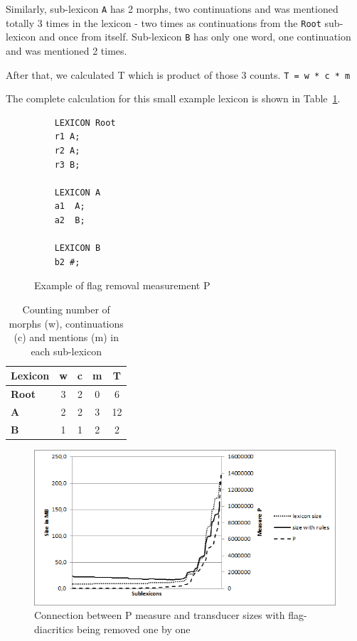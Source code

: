 \documentclass[10pt, a4paper]{article}
\begin{document}
Similarly, sub-lexicon \verb+A+ has 2 morphs, two continuations and was mentioned totally 3 times in the lexicon - 
two times as continuations from the \verb+Root+ sub-lexicon and once from itself. Sub-lexicon \verb+B+ has only one word, one continuation and was mentioned 2 times. 

After that, we calculated T which is product of 
those 3 counts.
\verb+T = w * c * m+

The complete calculation for this small example lexicon is shown in Table~\ref{table:measureP}.

\begin{figure}
\centering
\begin{verbatim}
    LEXICON Root
    r1 A;
    r2 A;
    r3 B;
    
    LEXICON A
    a1  A;
    a2  B;
    
    LEXICON B
    b2 #;
    \end{verbatim}
  
    \caption{Example of flag removal measurement P
    \label{fig:lexc-measures}}
\end{figure}

\begin{table}
    \centering
    \begin{tabular}{|l|c|c|c|c|}
        \hline
        \bf Lexicon & \bf w & \bf c & \bf m & \bf T \\
        \hline\hline
        \bf Root & 3 & 2 & 0 & 6  \\
        \bf A & 2 & 2 & 3 & 12 \\
        \bf B  & 1 & 1 & 2 & 2 \\
        \hline
    \end{tabular}
    \caption{Counting number of morphs (w), continuations (c) and mentions (m) in each sub-lexicon
    \label{table:measureP}}
\end{table}



\begin{figure}
    \includegraphics[width=\textwidth]{p-measure.png}
     \caption{Connection between P measure and transducer sizes with flag-diacritics being removed one by one
     \label{fig:p-measure-sizes}}
\end{figure}
\end{document}
